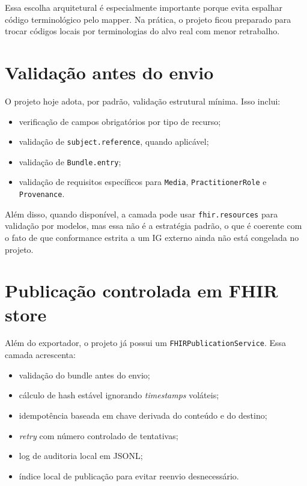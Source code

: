 \documentclass[
    12pt,
    openright,
    oneside,
    a4paper,
    chapter=TITLE,
    section=TITLE,
    brazil,
    sumario=tradicional,
    hidelinks
]{abntex2}
\begin{document}
Essa escolha arquitetural \'e especialmente importante porque evita espalhar c\'odigo terminol\'ogico pelo mapper. Na pr\'atica, o projeto ficou preparado para trocar c\'odigos locais por terminologias do alvo real com menor retrabalho.

\section{Valida\c{c}\~ao antes do envio}

O projeto hoje adota, por padr\~ao, valida\c{c}\~ao estrutural m\'inima. Isso inclui:

\begin{itemize}
    \item verifica\c{c}\~ao de campos obrigat\'orios por tipo de recurso;
    \item valida\c{c}\~ao de \texttt{subject.reference}, quando aplic\'avel;
    \item valida\c{c}\~ao de \texttt{Bundle.entry};
    \item valida\c{c}\~ao de requisitos espec\'ificos para \texttt{Media}, \texttt{PractitionerRole} e \texttt{Provenance}.
\end{itemize}

Al\'em disso, quando dispon\'ivel, a camada pode usar \texttt{fhir.resources} para valida\c{c}\~ao por modelos, mas essa n\~ao \'e a estrat\'egia padr\~ao, o que \'e coerente com o fato de que conformance estrita a um IG externo ainda n\~ao est\'a congelada no projeto.

\section{Publica\c{c}\~ao controlada em FHIR store}

Al\'em do exportador, o projeto j\'a possui um \texttt{FHIRPublicationService}. Essa camada acrescenta:

\begin{itemize}
    \item valida\c{c}\~ao do bundle antes do envio;
    \item c\'alculo de hash est\'avel ignorando \textit{timestamps} vol\'ateis;
    \item idempot\^encia baseada em chave derivada do conte\'udo e do destino;
    \item \textit{retry} com n\'umero controlado de tentativas;
    \item log de auditoria local em JSONL;
    \item \'indice local de publica\c{c}\~ao para evitar reenvio desnecess\'ario.
\end{itemize}
\end{document}
